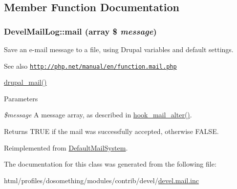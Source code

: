 \subsection{Member Function Documentation}
\hypertarget{classDevelMailLog_a1179208e4b2b37addefcc9f8ed9be0b0}{
\subsubsection[{mail}]{\setlength{\rightskip}{0pt plus 5cm}DevelMailLog::mail (array \$ {\em message})}}
\label{classDevelMailLog_a1179208e4b2b37addefcc9f8ed9be0b0}
Save an e-\/mail message to a file, using Drupal variables and default settings.

\begin{DoxySeeAlso}{See also}
\href{http://php.net/manual/en/function.mail.php}{\tt http://php.net/manual/en/function.mail.php} 

\hyperlink{mail_8inc_ab80781fd7273975a77cbbd13300eddbf}{drupal\_\-mail()}
\end{DoxySeeAlso}

\begin{DoxyParams}{Parameters}
\item[{\em \$message}]A message array, as described in \hyperlink{group__hooks_gaad1d55a8e7b359933f462a9ca5b2ede0}{hook\_\-mail\_\-alter()}. \end{DoxyParams}
\begin{DoxyReturn}{Returns}
TRUE if the mail was successfully accepted, otherwise FALSE. 
\end{DoxyReturn}


Reimplemented from \hyperlink{classDefaultMailSystem_a77a30a4f7b330e8fc811d8030004bb29}{DefaultMailSystem}.

The documentation for this class was generated from the following file:\begin{DoxyCompactItemize}
\item 
html/profiles/dosomething/modules/contrib/devel/\hyperlink{devel_8mail_8inc}{devel.mail.inc}\end{DoxyCompactItemize}
